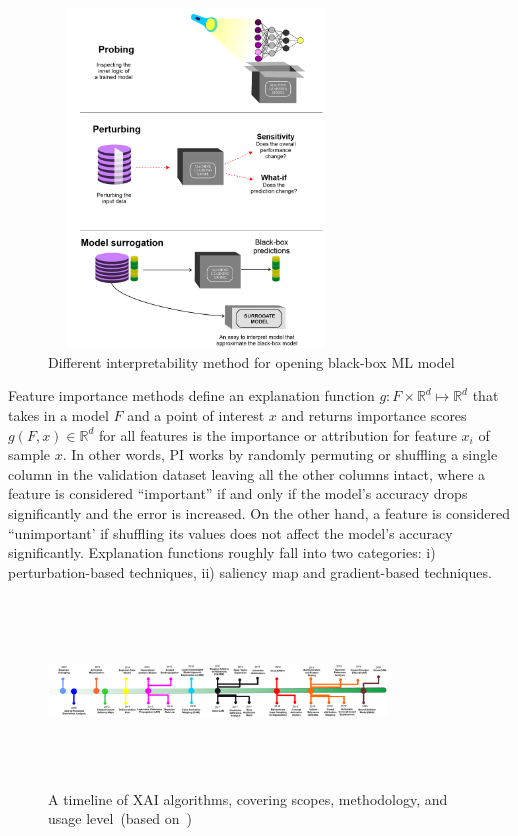 \begin{figure}[h]
	\centering
	\includegraphics[width=0.7\textwidth,height=90mm]{images/pro_per_surrogation.png}	
    \caption{Different interpretability method for opening black-box ML model}	
	\label{fig:pro_per_surroga}
\end{figure}

\hspace*{3.5mm} Feature importance methods define an explanation function $g: F \times \mathbb{R}^{d} \mapsto \mathbb{R}^{d}$ that takes in a model $F$ and a point of interest $x$ and returns importance scores $g(F,x) \in \mathbb{R}^{d}$ for all features is the importance or attribution for feature $x_i$ of sample $x$. In other words, PI works by randomly permuting or shuffling a single column in the validation dataset leaving all the other columns intact, where a feature is considered ``important” if and only if the model's accuracy drops significantly and the error is increased. On the other hand, a feature is considered ``unimportant’ if shuffling its values does not affect the model's accuracy significantly. Explanation functions roughly fall into two categories: i) perturbation-based techniques, ii) saliency map and gradient-based techniques. 

\begin{figure}
	\centering
	\includegraphics[width=0.8\textwidth,height=50mm]{images/xai_roadmap.png}	
    \caption{A timeline of XAI algorithms, covering scopes, methodology, and usage level~(based on~\cite{das2020opportunities})}	
	\label{fig:xai_timeline}
\end{figure}

